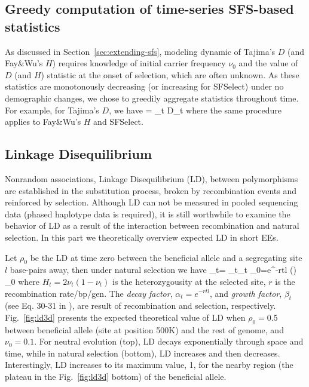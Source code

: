 \documentclass[11pt]{article}
\begin{document}
\subsection{Greedy computation of time-series SFS-based  
statistics}\label{app:agg}
As discussed in Section~\ref{sec:extending-sfs}, modeling dynamic of Tajima's 
$D$ (and Fay\&Wu's $H$) requires knowledge of initial carrier frequency $\nu_0$ 
and the value of $D$ (and $H$) statistic at the onset of selection, which are 
often unknown.
As these statistics are monotonously decreasing (or increasing for SFSelect) 
under no demographic changes, we chose to greedily aggregate statistics 
throughout time. For example, for Tajima's $D$, we have 
\beq
\Dc = \sum_{t \in \Tc} D_t
\eeq
where the same procedure applies to Fay\&Wu's $H$ and SFSelect.


\subsection{Linkage Disequilibrium}
Nonrandom associations, Linkage Disequilibrium (LD), between 
polymorphisms are established in the 
substitution process, broken by recombination events 
and reinforced by selection. 
Although LD can not be measured in pooled sequencing data (phased 
haplotype data is required), it is still worthwhile 
to examine the behavior of LD as a result of the interaction between 
recombination and natural selection. In this part we theoretically overview 
expected LD in short EEs.

Let $\rho_0$ be the LD at time zero between the beneficial allele and a 
segregating site $l$ base-pairs away, then under natural selection we have
\beq
\rho_t= \alpha_t\beta_t \rho_0=e^{-rtl} \left(\right)  
\rho_0\label{eq:ldt}
\eeq
where $H_t=2\nu_t(1-\nu_t)$ is the heterozygousity at the selected site, $r$ is 
the recombination rate/bp/gen. The 
\emph{decay factor}, $\alpha_t=e^{-rtl}$,
and \emph{growth factor}, $\beta_t$ (see Eq. 30-31 in 
\cite{Stephan2006The}), are result of recombination and 
selection, respectively. Fig.~\ref{fig:ld3d} presents the expected theoretical 
value of LD when $\rho_0=0.5$ between beneficial allele (site at position 500K) 
and the rest of 
genome, and $\nu_0=0.1$. For neutral evolution (top), LD decays exponentially 
through space and time, while in natural selection (bottom), LD increases and 
then decreases. Interestingly, LD increases to its maximum value, 1, for the 
nearby region (the plateau in the Fig.~\ref{fig:ld3d} bottom) of the beneficial 
allele.
\end{document}

